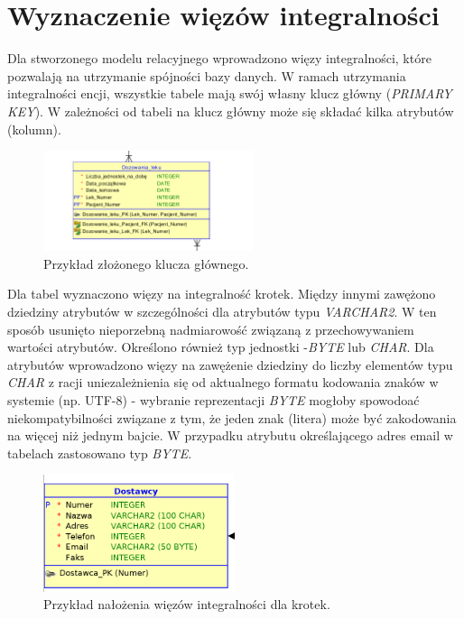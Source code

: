 \section{Wyznaczenie więzów integralności}
Dla stworzonego modelu relacyjnego wprowadzono więzy integralności, które pozwalają na utrzymanie spójności bazy danych. W ramach utrzymania integralności encji, wszystkie tabele mają swój własny klucz główny (\textit{PRIMARY KEY}). W zależności od tabeli na klucz główny może się składać kilka atrybutów (kolumn).

\begin{figure}[H]
\centering
\includegraphics[width=0.55\textwidth]{img/dwa_PK.png}
\caption{\small Przykład złożonego klucza głównego.}
\end{figure}

Dla tabel wyznaczono więzy na integralność krotek. Między innymi zawężono dziedziny atrybutów w szczególności dla atrybutów typu \textit{VARCHAR2}. W ten sposób usunięto nieporzebną nadmiarowość związaną z przechowywaniem wartości atrybutów. Określono również typ jednostki -\textit{BYTE} lub \textit{CHAR}. Dla atrybutów wprowadzono więzy na zawężenie dziedziny do liczby elementów typu \textit{CHAR} z racji uniezależnienia się od aktualnego formatu kodowania znaków w systemie (np. UTF-8) - wybranie reprezentacji \textit{BYTE} mogłoby spowodoać niekompatybilności związane z tym, że jeden znak (litera) może być zakodowania na więcej niż jednym bajcie. W przypadku atrybutu określającego adres email w tabelach zastosowano typ \textit{BYTE}.

\begin{figure}[H]
\centering
\includegraphics[width=0.5\textwidth]{img/dostawcy.png}
\caption{\small Przykład nałożenia więzów integralności dla krotek.}
\end{figure}

